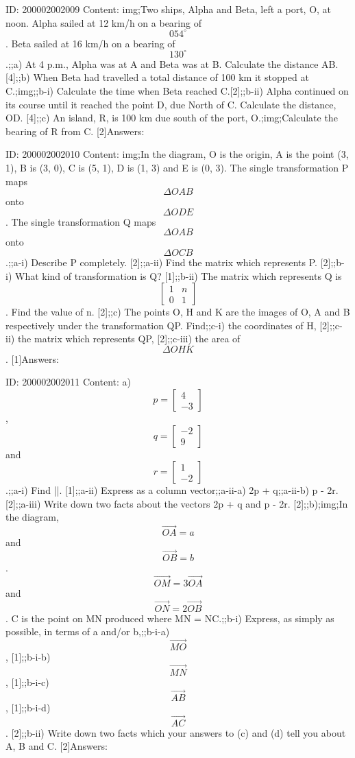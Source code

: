 \documentclass{article}
\begin{document}
ID: 200002002009
Content:
img;Two ships, Alpha and Beta, left a port, O, at noon. Alpha sailed at 12 km/h on a bearing of $$054^{\circ}$$. Beta sailed at 16 km/h on a bearing of $$130^{\circ}$$.;;a) At 4 p.m., Alpha was at A and Beta was at B. Calculate the distance AB. [4];;b) When Beta had travelled a total distance of 100 km it stopped at C.;img;;b-i) Calculate the time when Beta reached C.[2];;b-ii) Alpha continued on its course until it reached the point D, due North of C. Calculate the distance, OD. [4];;c) An island, R, is 100 km due south of the port, O.;img;Calculate the bearing of R from C. [2]Answers:

ID: 200002002010
Content:
img;In the diagram, O is the origin, A is the point (3, 1), B is (3, 0), C is (5, 1), D is (1, 3) and E is (0, 3). The single transformation P maps $$\Delta  OAB$$ onto $$\Delta  ODE$$. The single transformation Q maps $$\Delta  OAB$$ onto $$\Delta  OCB$$.;;a-i) Describe P completely. [2];;a-ii) Find the matrix which represents P. [2];;b-i) What kind of transformation is Q? [1];;b-ii) The matrix which represents Q is $$\begin{bmatrix}1&n\\0&1\end{bmatrix}$$. Find the value of n. [2];;c) The points O, H and K are the images of O, A and B respectively under the transformation QP. Find;;c-i) the coordinates of H, [2];;c-ii) the matrix which represents QP, [2];;c-iii) the area of $$\Delta  OHK$$. [1]Answers:

ID: 200002002011
Content:
a) $$p=\begin{bmatrix}4\\-3\end{bmatrix}$$, $$q=\begin{bmatrix}-2\\9\end{bmatrix}$$ and $$r=\begin{bmatrix}1\\-2\end{bmatrix}$$.;;a-i) Find |\q|. [1];;a-ii) Express as a column vector;;a-ii-a) 2p + q;;a-ii-b) p - 2r. [2];;a-iii) Write down two facts about the vectors 2p + q and p - 2r. [2];;b);img;In the diagram, $$\vec{OA}=a$$ and $$\vec{OB}=b$$.$$\vec{OM}=3\vec{OA}$$ and $$\vec{ON}=2\vec{OB}$$. C is the point on MN produced where MN = NC.;;b-i) Express, as simply as possible, in terms of a and/or b,;;b-i-a) $$\vec{MO}$$, [1];;b-i-b) $$\vec{MN}$$, [1];;b-i-c) $$\vec{AB}$$, [1];;b-i-d) $$\vec{AC}$$. [2];;b-ii) Write down two facts which your answers to (c) and (d) tell you about A, B and C. [2]Answers:
\end{document}
